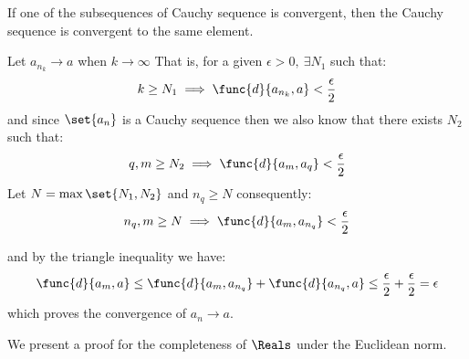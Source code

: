 \begin{lemma} \label{convergenceSubsequence}
    If one of the subsequences of Cauchy sequence is convergent, then the Cauchy sequence is convergent to the same element.
\end{lemma}

\begin{prooflemma}
    Let \(a_{n_k} \to a \) when \(k \to \infty\) That is, for a given \(\epsilon > 0,\: \exists N_1\) such that:
    \begin{equation*}
        k \geq N_1 \implies \func{d}{a_{n_k},a} < \frac{\epsilon}{2}
    \end{equation*}
    and since \(\set{a_n} \) is a Cauchy sequence then we also know that there exists \(N_2\) such that:
    \begin{equation*}
        q,m \geq N_2 \implies \func{d}{a_m,a_q} < \frac{\epsilon}{2} 
    \end{equation*}
    Let \(N = \max \set{ N_1, N_2} \) and \(n_q \geq N\) consequently:
    \begin{equation*}
        n_q,m \geq N \implies \func{d}{a_m,a_{n_q}} < \frac{\epsilon}{2}
    \end{equation*}

    and by the triangle inequality we have:
    \begin{equation*}
        \func{d}{a_m,a} \leq \func{d}{a_m, a_{n_q}} + \func{d}{a_{n_q},a} \leq \frac{\epsilon}{2} + \frac{\epsilon}{2} = \epsilon
    \end{equation*}
    which proves the convergence of \(a_n \to a\).
\end{prooflemma}

We present a proof for the completeness of \(\Reals\) under the Euclidean norm.

